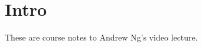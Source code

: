 \documentclass{article}
\begin{document}
\section{Intro}
These are course notes to Andrew Ng's video lecture\citep{andrewng}.

\printbibliography
\end{document}
